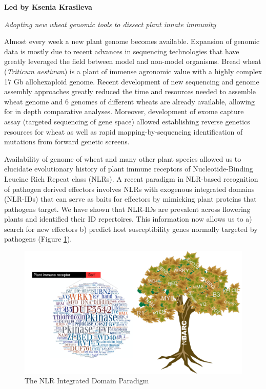 \documentclass[12pt,]{book}
\theoremstyle{definition}
\theoremstyle{definition}
\theoremstyle{remark}
\begin{document}
\textbf{Led by Ksenia Krasileva}

\emph{Adopting new wheat genomic tools to dissect plant innate immunity}

Almost every week a new plant genome becomes available. Expansion of
genomic data is mostly due to recent advances in sequencing technologies
that have greatly leveraged the field between model and non-model
organisms. Bread wheat (\emph{Triticum aestivum}) is a plant of immense
agronomic value with a highly complex 17 Gb allohexaploid genome. Recent
development of new sequencing and genome assembly approaches greatly
reduced the time and resources needed to assemble wheat genome and 6
genomes of different wheats are already available, allowing for in depth
comparative analyses. Moreover, development of exome capture assay
(targeted sequencing of gene space) allowed establishing reverse
genetics resources for wheat as well as rapid mapping-by-sequencing
identification of mutations from forward genetic screens.

Availability of genome of wheat and many other plant species allowed us
to elucidate evolutionary history of plant immune receptors of
Nucleotide-Binding Leucine Rich Repeat class (NLRs). A recent paradigm
in NLR-based recognition of pathogen derived effectors involves NLRs
with exogenous integrated domains (NLR-IDs) that can serve as baits for
effectors by mimicking plant proteins that pathogens target. We have
shown that NLR-IDs are prevalent across flowering plants and identified
their ID repertoires. This information now allows us to a) search for
new effectors b) predict host susceptibility genes normally targeted by
pathogens (Figure \ref{fig:mainwg}).

\begin{figure}[htbp]
\centering
\includegraphics{assets/kk_fig1.pdf}
\caption{\label{fig:mainwg}The NLR Integrated Domain Paradigm}
\end{figure}
\end{document}
